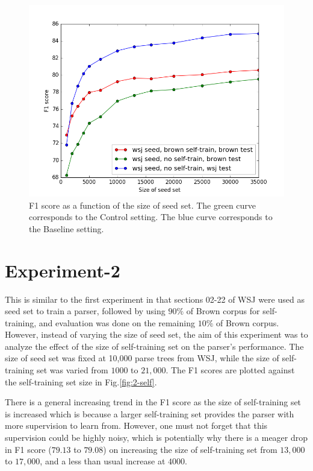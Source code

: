 \documentclass{sig-alternate-05-2015}
\begin{document}
\begin{figure}
\centering
\includegraphics[width=0.95\columnwidth]{figs/fig-1-seed}
\caption{F1 score as a function of the size of seed set. The green curve corresponds to the Control setting. The blue curve corresponds to the Baseline setting.}
\label{fig:1-seed}
\end{figure}

\section{Experiment-2}
This is similar to the first experiment in that sections 02-22 of WSJ were used as seed set to train a parser, followed by using $90\%$ of Brown corpus for self-training, and evaluation was done on the remaining $10\%$ of Brown corpus. However, instead of varying the size of seed set, the aim of this experiment was to analyze the effect of the size of self-training set on the parser's performance. The size of seed set was fixed at 10,000 parse trees from WSJ, while the size of self-training set was varied from $1000$ to $21,000$. The F1 scores are plotted against the self-training set size in Fig.\ref{fig:2-self}.

There is a general increasing trend in the F1 score as the size of self-training set is increased which is because a larger self-training set provides the parser with more supervision to learn from. However, one must not forget that this supervision could be highly noisy, which is potentially why there is a meager drop in F1 score ($79.13$ to $79.08$) on increasing the size of self-training set from $13,000$ to $17,000$, and a less than usual increase at $4000$.
\end{document}
